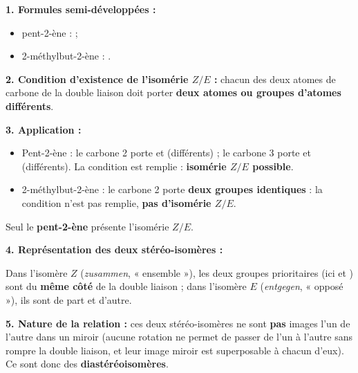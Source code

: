 \documentclass[11pt]{article}
\begin{document}
\begin{corrige}
\textbf{1. Formules semi-développées :}
\begin{itemize}
\item pent-2-ène :  ;
\item 2-méthylbut-2-ène : .
\end{itemize}

\textbf{2. Condition d'existence de l'isomérie $Z/E$ :} chacun des deux atomes de carbone de la double liaison  doit porter \textbf{deux atomes ou groupes d'atomes différents}.

\textbf{3. Application :}
\begin{itemize}
\item Pent-2-ène : le carbone 2 porte  et  (différents) ; le carbone 3 porte  et  (différents). La condition est remplie : \textbf{isomérie $Z/E$ possible}.
\item 2-méthylbut-2-ène : le carbone 2 porte \textbf{deux groupes  identiques} : la condition n'est pas remplie, \textbf{pas d'isomérie $Z/E$}.
\end{itemize}
Seul le \textbf{pent-2-ène} présente l'isomérie $Z/E$.

\textbf{4. Représentation des deux stéréo-isomères :}
\begin{center}
\end{center}
Dans l'isomère $Z$ (\emph{zusammen}, « ensemble »), les deux groupes prioritaires (ici  et ) sont du \textbf{même côté} de la double liaison ; dans l'isomère $E$ (\emph{entgegen}, « opposé »), ils sont de part et d'autre.

\textbf{5. Nature de la relation :} ces deux stéréo-isomères ne sont \textbf{pas} images l'un de l'autre dans un miroir (aucune rotation ne permet de passer de l'un à l'autre sans rompre la double liaison, et leur image miroir est superposable à chacun d'eux). Ce sont donc des \textbf{diastéréoisomères}.
\end{corrige}
\end{document}
